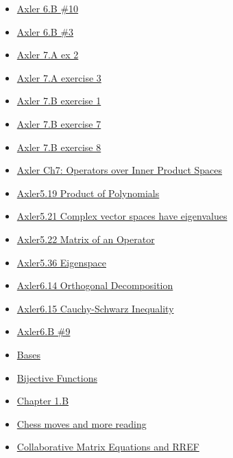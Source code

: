 \documentclass[11pt]{article}
\begin{document}
\begin{itemize}
\begin{itemize}
\begin{itemize}
\item \href{mathematics/linear\_algebra/KBe21math530retAxler6B10.org}{Axler 6.B \#10}
\item \href{mathematics/linear\_algebra/KBe21math530retAxler6B3.org}{Axler 6.B \#3}
\item \href{mathematics/linear\_algebra/KBe21math530retAxler7A2.org}{Axler 7.A ex 2}
\item \href{mathematics/linear\_algebra/KBe21math530retAxler7A3.org}{Axler 7.A exercise 3}
\item \href{mathematics/linear\_algebra/KBe21math530retAxler7B1.org}{Axler 7.B exercise 1}
\item \href{mathematics/linear\_algebra/KBe21math530retAxler7B7.org}{Axler 7.B exercise 7}
\item \href{mathematics/linear\_algebra/KBe21math530retAxler7B8.org}{Axler 7.B exercise 8}
\item \href{mathematics/linear\_algebra/KBrefOperatorsOverInnerProductSpaces.org}{Axler Ch7: Operators over Inner Product Spaces}
\item \href{mathematics/linear\_algebra/KBrefProductOfPolynomials.org}{Axler5.19 Product of Polynomials}
\item \href{mathematics/linear\_algebra/KBrefComplexOperatorsHaveEigenvalues.org}{Axler5.21 Complex vector spaces have eigenvalues}
\item \href{mathematics/linear\_algebra/KBrefMatrixOfAnOperator.org}{Axler5.22 Matrix of an Operator}
\item \href{mathematics/linear\_algebra/KBrefEigenspace.org}{Axler5.36 Eigenspace}
\item \href{mathematics/linear\_algebra/KBrefOrthogonalDecomposition.org}{Axler6.14 Orthogonal Decomposition}
\item \href{mathematics/linear\_algebra/KBrefCauchySchwarzInequality.org}{Axler6.15 Cauchy-Schwarz Inequality}
\item \href{mathematics/linear\_algebra/KBe21math530retAxler6B9.org}{Axler6.B \#9}
\item \href{mathematics/linear\_algebra/KBeRefLinAlgBases.org}{Bases}
\item \href{mathematics/linear\_algebra/KBrefBijectiveFunction.org}{Bijective Functions}
\item \href{mathematics/linear\_algebra/KBxChapter1B.org}{Chapter 1.B}
\item \href{mathematics/linear\_algebra/KBxChessMovesandMoreReading.org}{Chess moves and more reading}
\item \href{mathematics/linear\_algebra/KBe20math530retCollaborativeMatrixEquationsRREF.org}{Collaborative Matrix Equations and RREF}

\end{itemize}
\end{itemize}
\end{itemize}
\end{document}
